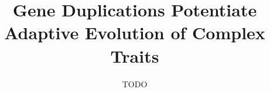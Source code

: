 \title{Gene Duplications Potentiate Adaptive Evolution of Complex Traits}
\author{TODO} %

\maketitle
